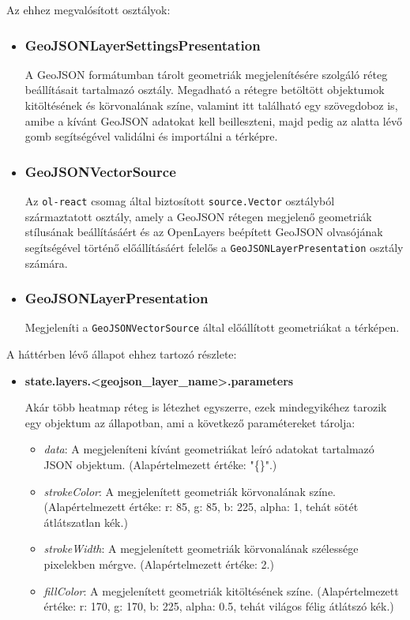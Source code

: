 \noindent Az ehhez megvalósított osztályok:
\begin{itemize}

\item\subsubsection{GeoJSONLayerSettingsPresentation}
A GeoJSON formátumban tárolt geometriák megjelenítésére szolgáló réteg
beállításait tartalmazó osztály. Megadható a rétegre betöltött objektumok
kitöltésének és körvonalának színe, valamint itt található egy szövegdoboz is,
amibe a kívánt GeoJSON adatokat kell beilleszteni, majd pedig az alatta lévő
gomb segítségével validálni és importálni a térképre.

\item\subsubsection{GeoJSONVectorSource}
Az \verb|ol-react| csomag által biztosított \verb|source.Vector| osztályból
származtatott osztály, amely a GeoJSON rétegen megjelenő geometriák stílusának
beállításáért és az OpenLayers beépített GeoJSON olvasójának segítségével
történő előállításáért felelős a \verb|GeoJSONLayerPresentation| osztály
számára.

\item\subsubsection{GeoJSONLayerPresentation}
Megjeleníti a \verb|GeoJSONVectorSource| által előállított geometriákat a
térképen.

\end{itemize}
\noindent A háttérben lévő állapot ehhez tartozó részlete:
\begin{itemize}

  \item \textbf{state.layers.<geojson\_layer\_name>.parameters}

  Akár több heatmap réteg is létezhet egyszerre, ezek mindegyikéhez tarozik egy
  objektum az állapotban, ami a következő paramétereket tárolja:

  \begin{itemize}
  \item \textit{data}:
    A megjeleníteni kívánt geometriákat leíró adatokat tartalmazó JSON
    objektum.
    (Alapértelmezett értéke: "\{\}".)
  \item \textit{strokeColor}:
    A megjelenített geometriák körvonalának színe.
    (Alapértelmezett értéke: {r: 85, g: 85, b: 225, alpha: 1}, tehát sötét
    átlátszatlan kék.)
  \item \textit{strokeWidth}:
    A megjelenített geometriák körvonalának szélessége pixelekben mérgve.
    (Alapértelmezett értéke: 2.)
  \item \textit{fillColor}:
    A megjelenített geometriák kitöltésének színe.
    (Alapértelmezett értéke: {r: 170, g: 170, b: 225, alpha: 0.5}, tehát világos
    félig átlátszó kék.)
  \end{itemize}

\end{itemize}

